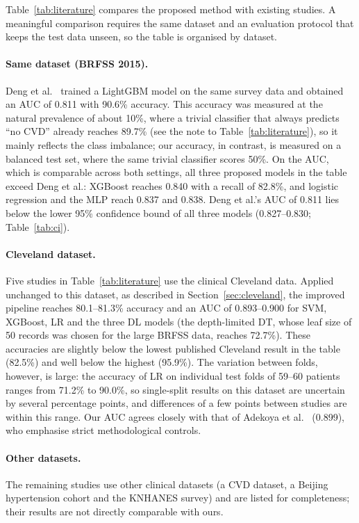Table~\ref{tab:literature} compares the proposed method with existing
studies. A meaningful comparison requires the same dataset and an
evaluation protocol that keeps the test data unseen, so the table is
organised by dataset.

\paragraph{Same dataset (BRFSS 2015).} Deng et al.~\cite{deng} trained a
LightGBM model on the same survey data and obtained an AUC of 0.811 with
90.6\% accuracy. This accuracy was measured at the natural prevalence of
about 10\%, where a trivial classifier that always predicts ``no CVD''
already reaches 89.7\% (see the note to Table~\ref{tab:literature}), so it
mainly reflects the class imbalance; our accuracy, in contrast, is measured
on a balanced test set, where the same trivial classifier scores 50\%. On
the AUC, which is comparable across both settings, all three proposed models
in the table exceed Deng et al.: XGBoost reaches 0.840 with a recall of
82.8\%, and logistic regression and the MLP reach 0.837 and 0.838. Deng et
al.'s AUC of 0.811 lies below the lower 95\% confidence bound of all three
models (0.827--0.830; Table~\ref{tab:ci}).

\paragraph{Cleveland dataset.} Five studies in Table~\ref{tab:literature}
use the clinical Cleveland data. Applied unchanged to this dataset, as
described in Section~\ref{sec:cleveland}, the improved pipeline reaches
80.1--81.3\% accuracy and an AUC of 0.893--0.900 for SVM, XGBoost, LR and
the three DL models (the depth-limited DT, whose leaf size of 50 records was
chosen for the large BRFSS data, reaches 72.7\%). These accuracies are
slightly below the lowest published Cleveland result in the table (82.5\%)
and well below the highest (95.9\%). The variation between folds, however,
is large: the accuracy of LR on individual test folds of 59--60 patients
ranges from 71.2\% to 90.0\%, so single-split results on this dataset are
uncertain by several percentage points, and differences of a few points
between studies are within this range. Our AUC agrees closely with that of
Adekoya et al.~\cite{adekoya2025} (0.899), who emphasise strict
methodological controls.

\paragraph{Other datasets.} The remaining studies use other clinical
datasets (a CVD dataset, a Beijing hypertension cohort and the KNHANES
survey) and are listed for completeness; their results are not directly
comparable with ours.

